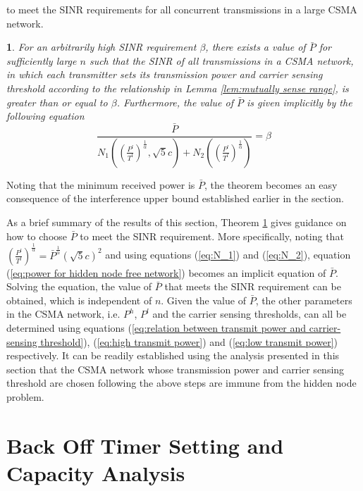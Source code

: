 \documentclass[english]{IEEEtran}
\theoremstyle{plain}
\newtheorem{thm}{\protect\theoremname}
\theoremstyle{plain}
\theoremstyle{plain}
\theoremstyle{remark}
\providecommand{\theoremname}{Theorem}
\begin{document}
to meet the SINR requirements for all concurrent transmissions in
a large CSMA network.
\begin{thm}
\label{thm:hidden node free}For an arbitrarily high SINR requirement
$\beta$, there exists a value of $\bar{P}$ for sufficiently large
$n$ such that the SINR of all transmissions in a CSMA network, in
which each transmitter sets its transmission power and carrier sensing
threshold according to the relationship in Lemma \ref{lem:mutually sense range},
is greater than or equal to $\beta$. Furthermore, the value of $\bar{P}$
is given implicitly by the following equation
\begin{equation}
\frac{\bar{P}}{N_{1}\left(\left(\frac{P^{l}}{T^{l}}\right)^{\frac{1}{\alpha}},\sqrt{5}c\right)+N_{2}\left(\left(\frac{P^{l}}{T^{l}}\right)^{\frac{1}{\alpha}}\right)}=\beta\label{eq:power for hidden node free network}
\end{equation}
\end{thm}
\begin{IEEEproof}
Noting that the minimum received power is $\bar{P}$, the theorem
becomes an easy consequence of the interference upper bound established
earlier in the section.
\end{IEEEproof}
As a brief summary of the results of this section, Theorem \ref{thm:hidden node free}
gives guidance on how to choose $\bar{P}$ to meet the SINR requirement.
More specifically, noting that $\left(\frac{P^{l}}{T^{l}}\right)^{\frac{1}{\alpha}}=\bar{P}^{\frac{1}{\alpha}}\left(\sqrt{5}c\right)^{2}$
and using equations (\ref{eq:N_1}) and (\ref{eq:N_2}), equation
(\ref{eq:power for hidden node free network}) becomes an implicit
equation of $\bar{P}$. Solving the equation, the value of $\bar{P}$
that meets the SINR requirement can be obtained, which is independent
of $n$. Given the value of $\bar{P}$, the other parameters in the
CSMA network, i.e. $P^{h}$, $P^{l}$ and the carrier sensing thresholds,
can all be determined using equations (\ref{eq:relation between transmit power and carrier-sensing threshold}),
(\ref{eq:high transmit power}) and (\ref{eq:low transmit power})
respectively. It can be readily established using the analysis presented
in this section that the CSMA network whose transmission power and
carrier sensing threshold are chosen following the above steps are
immune from the hidden node problem.


\section{Back Off Timer Setting and Capacity Analysis\label{sec:Capacity-Analysis}}
\end{document}
